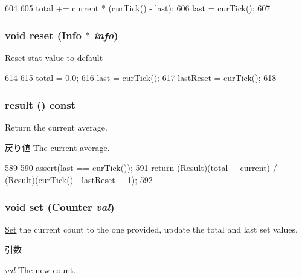 \begin{DoxyCode}
604     {
605         total += current * (curTick() - last);
606         last = curTick();
607     }
\end{DoxyCode}
\hypertarget{classStats_1_1AvgStor_a10d9d71be6e0d2194999bb5dd5280e2d}{
\subsubsection[{reset}]{\setlength{\rightskip}{0pt plus 5cm}void reset ({\bf Info} $\ast$ {\em info})}}
\label{classStats_1_1AvgStor_a10d9d71be6e0d2194999bb5dd5280e2d}
Reset stat value to default 


\begin{DoxyCode}
614     {
615         total = 0.0;
616         last = curTick();
617         lastReset = curTick();
618     }
\end{DoxyCode}
\hypertarget{classStats_1_1AvgStor_ae050da86c3d8e8a677a0bdeb7971e1e3}{
\subsubsection[{result}]{ result () const}}
\label{classStats_1_1AvgStor_ae050da86c3d8e8a677a0bdeb7971e1e3}
Return the current average. \begin{DoxyReturn}{戻り値}
The current average. 
\end{DoxyReturn}



\begin{DoxyCode}
589     {
590         assert(last == curTick());
591         return (Result)(total + current) / (Result)(curTick() - lastReset + 1);
592     }
\end{DoxyCode}
\hypertarget{classStats_1_1AvgStor_a7687ba04921eb09ab374fb40c4e1eb9d}{
\subsubsection[{set}]{\setlength{\rightskip}{0pt plus 5cm}void set ({\bf Counter} {\em val})}}
\label{classStats_1_1AvgStor_a7687ba04921eb09ab374fb40c4e1eb9d}
\hyperlink{classSet}{Set} the current count to the one provided, update the total and last set values. 
\begin{DoxyParams}{引数}
\item[{\em val}]The new count. \end{DoxyParams}



